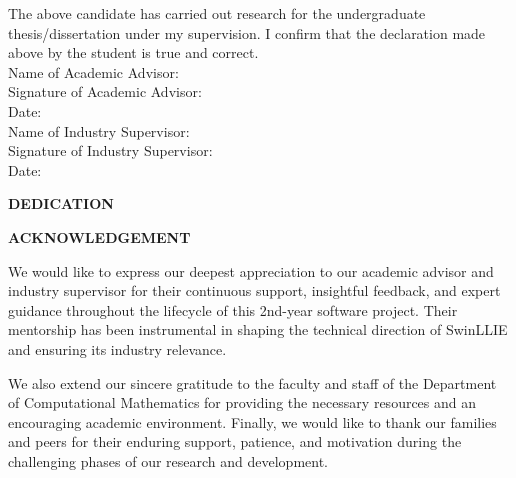 \documentclass[12pt, a4paper]{report}
\begin{document}
\noindent The above candidate has carried out research for the undergraduate thesis/dissertation under my supervision. I confirm that the declaration made above by the student is true and correct.\\[0.3in]

\noindent Name of Academic Advisor: \makebox[3.5in]{\dotfill}\\[0.2in]
\noindent Signature of Academic Advisor: \makebox[2.9in]{\dotfill}\\[0.2in]
\noindent Date: \makebox[2.3in]{\dotfill}\\[0.25in]

\noindent Name of Industry Supervisor: \makebox[3.45in]{\dotfill}\\[0.2in]
\noindent Signature of Industry Supervisor: \makebox[2.85in]{\dotfill}\\[0.2in]
\noindent Date: \makebox[2.3in]{\dotfill}

\clearpage
{}
\begin{center}
    \textbf{DEDICATION}
\end{center}
\vspace{0.3in}



\clearpage
{}
\begin{center}
    \textbf{ACKNOWLEDGEMENT}
\end{center}
\vspace{0.3in}
\noindent We would like to express our deepest appreciation to our academic advisor and industry supervisor for their continuous support, insightful feedback, and expert guidance throughout the lifecycle of this 2nd-year software project. Their mentorship has been instrumental in shaping the technical direction of SwinLLIE and ensuring its industry relevance. 

We also extend our sincere gratitude to the faculty and staff of the Department of Computational Mathematics for providing the necessary resources and an encouraging academic environment. Finally, we would like to thank our families and peers for their enduring support, patience, and motivation during the challenging phases of our research and development.
\end{document}
